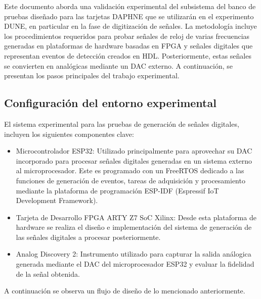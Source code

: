 Este documento aborda una validación experimental del subsistema del banco de pruebas diseñado para las tarjetas DAPHNE que se utilizarán en el experimento DUNE, en particular en la fase de digitización de señales. La metodología incluye los procedimientos requeridos para probar señales de reloj de varias frecuencias generadas en plataformas de hardware basadas en FPGA y señales digitales que representan eventos de detección creados en HDL. Posteriormente, estas señales se convierten en analógicas mediante un DAC externo. A continuación, se presentan los pasos principales del trabajo experimental.


    \subsection{Configuración del entorno experimental}
    
    El sistema experimental para las pruebas de generación de señales digitales, incluyen los siguientes componentes clave:
    \begin{itemize}
        \item Microcontrolador ESP32: Utilizado principalmente para aprovechar su DAC incorporado para procesar señales digitales generadas en un sistema externo al microprocesador. Este es programado con un FreeRTOS dedicado a las funciones de generación de eventos, tareas de adquisición y procesamiento mediante la plataforma de programación ESP-IDF (Espressif IoT Development Framework).
        
        \item Tarjeta de Desarrollo FPGA ARTY Z7 SoC Xilinx: Desde esta plataforma de hardware se realiza el diseño e implementación del sistema de generación de las señales digitales a procesar posteriormente.
        \item Analog Discovery 2: Instrumento utilizado para capturar la salida análogica generada mediante el DAC del microprocesador ESP32 y evaluar la fidelidad de la señal obtenida.
    \end{itemize}
    
    A continuación se observa un flujo de diseño de lo mencionado anteriormente.

    \vspace{0.3cm}

